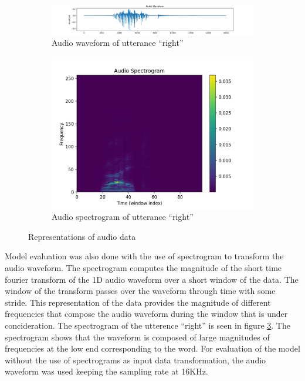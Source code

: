 \documentclass{article}
\begin{document}
\begin{figure}
  \begin{subfigure}{.5\linewidth}
    \includegraphics[width=\linewidth]{images/waveform-right}
    \caption{Audio waveform of utterance ``right''}
    \label{fig:wave_right}
  \end{subfigure}%
  \begin{subfigure}{.5\linewidth}
    \includegraphics[width=\linewidth]{images/spectrogram-right}
    \caption{Audio spectrogram of utterance ``right''}
    \label{fig:spec_right}
  \end{subfigure}
  \caption{Representations of audio data}
\end{figure}

Model evaluation was also done with the use of spectrogram to
transform the audio waveform. The spectrogram computes the magnitude
of the short time fourier transform of the 1D audio waveform over a
short window of the data. The window of the transform passes over the
waveform through time with some stride. This representation of the
data provides the magnitude of different frequencies that compose the
audio waveform during the window that is under concideration. The
spectrogram of the utterence ``right'' is seen in figure
\ref{fig:spec_right}. The spectrogram shows that the waveform is
composed of large magnitudes of frequencies at the low end
corresponding to the word. For evaluation of the model without the use
of spectrograms as input data transformation, the audio waveform was
used keeping the sampling rate at 16KHz.
\end{document}

